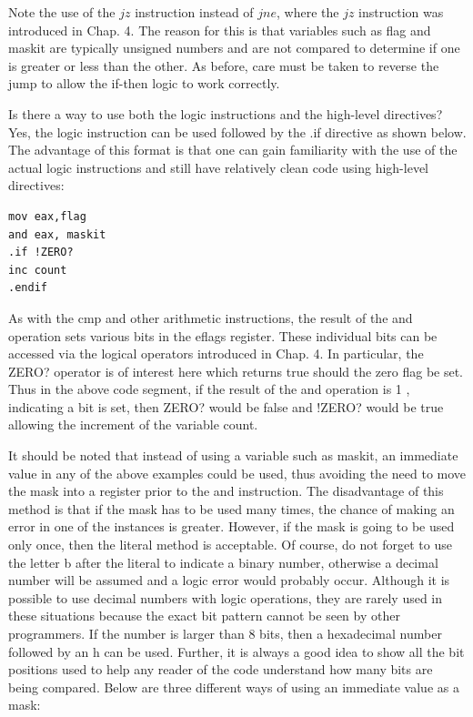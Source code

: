 \documentclass[10pt]{book}
\begin{document}
Note the use of the $j z$ instruction instead of $j n e$, where the $j z$ instruction was introduced in Chap. 4. The reason for this is that variables such as flag and maskit are typically unsigned numbers and are not compared to determine if one is greater or less than the other. As before, care must be taken to reverse the jump to allow the if-then logic to work correctly.


Is there a way to use both the logic instructions and the high-level directives? Yes, the logic instruction can be used followed by the .if directive as shown below. The advantage of this format is that one can gain familiarity with the use of the actual logic instructions and still have relatively clean code using high-level directives:

\begin{verbatim}
mov eax,flag
and eax, maskit
.if !ZERO?
inc count
.endif
\end{verbatim}

As with the cmp and other arithmetic instructions, the result of the and operation sets various bits in the eflags register. These individual bits can be accessed via the logical operators introduced in Chap. 4. In particular, the ZERO? operator is of interest here which returns true should the zero flag be set. Thus in the above code segment, if the result of the and operation is 1 , indicating a bit is set, then ZERO? would be false and !ZERO? would be true allowing the increment of the variable count.

It should be noted that instead of using a variable such as maskit, an immediate value in any of the above examples could be used, thus avoiding the need to move the mask into a register prior to the and instruction. The disadvantage of this method is that if the mask has to be used many times, the chance of making an error in one of the instances is greater. However, if the mask is going to be used only once, then the literal method is acceptable. Of course, do not forget to use the letter b after the literal to indicate a binary number, otherwise a decimal number will be assumed and a logic error would probably occur. Although it is possible to use decimal numbers with logic operations, they are rarely used in these situations because the exact bit pattern cannot be seen by other programmers. If the number is larger than 8 bits, then a hexadecimal number followed by an h can be used. Further, it is always a good idea to show all the bit positions used to help any reader of the code understand how many bits are being compared. Below are three different ways of using an immediate value as a mask:
\end{document}
